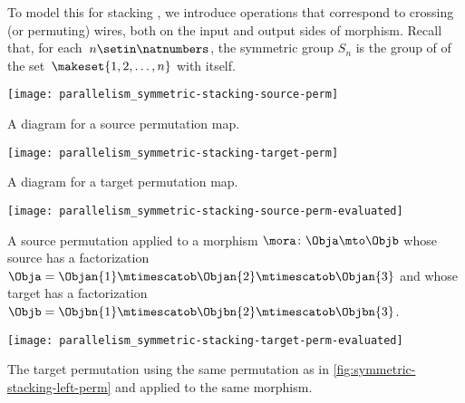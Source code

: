 To model this for stacking , we introduce operations that correspond to crossing (or permuting) wires, both on the input and output sides of morphism.
Recall that, for each~$n \setin \natnumbers$, the symmetric group $S_n$ is the group of  of the set~$\makeset{1, 2, \ldots, n }$ with itself.


\begin{marginfigure}
    \centering
    \texttt{[image: parallelism\_symmetric-stacking-source-perm]}
    \caption{A diagram for a source permutation map.}
    \label{fig:symmetric-stacking-left-perm}
\end{marginfigure}

\begin{marginfigure}
    \centering
    \texttt{[image: parallelism\_symmetric-stacking-target-perm]}
    \caption{A diagram for a target permutation map.}
\end{marginfigure}

\begin{marginfigure}
    \centering
    \texttt{[image: parallelism\_symmetric-stacking-source-perm-evaluated]}
    \caption{A source permutation applied to a morphism $\mora \colon \Obja \mto \Objb$ whose source has a factorization $\Obja = \Objan{1} \mtimescatob \Objan{2}  \mtimescatob \Objan{3}$ and whose target has a factorization $\Objb = \Objbn{1} \mtimescatob \Objbn{2}  \mtimescatob \Objbn{3}$.}
    \label{fig:symmetric-stacking-left-perm-evaluated}
\end{marginfigure}

\begin{marginfigure}
    \centering
    \texttt{[image: parallelism\_symmetric-stacking-target-perm-evaluated]}
    \caption{The target permutation using the same permutation as in \cref{fig:symmetric-stacking-left-perm} and applied to the same morphism.}
    \label{fig:symmetric-stacking-target-perm}
\end{marginfigure}

